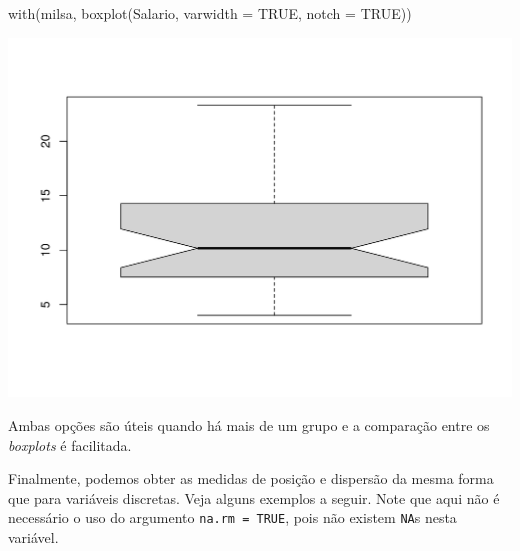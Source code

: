 \documentclass[
  10pt,
  a4paper]{book}
\newenvironment{Shaded}{\begin{snugshade}}{\end{snugshade}}
\newcommand{\AttributeTok}[1]{\textcolor[rgb]{0.77,0.63,0.00}{#1}}
\newcommand{\ConstantTok}[1]{\textcolor[rgb]{0.00,0.00,0.00}{#1}}
\newcommand{\FunctionTok}[1]{\textcolor[rgb]{0.00,0.00,0.00}{#1}}
\newcommand{\NormalTok}[1]{#1}
\begin{document}
\begin{Shaded}
\begin{Highlighting}[]
\FunctionTok{with}\NormalTok{(milsa, }\FunctionTok{boxplot}\NormalTok{(Salario, }\AttributeTok{varwidth =} \ConstantTok{TRUE}\NormalTok{, }\AttributeTok{notch =} \ConstantTok{TRUE}\NormalTok{))}
\end{Highlighting}
\end{Shaded}

\begin{center}\includegraphics{figures/unnamed-chunk-315-1} \end{center}

Ambas opções são úteis quando há mais de um grupo e a comparação entre
os \emph{boxplots} é facilitada.

Finalmente, podemos obter as medidas de posição e dispersão da mesma
forma que para variáveis discretas. Veja alguns exemplos a seguir. Note
que aqui não é necessário o uso do argumento \texttt{na.rm\ =\ TRUE}, pois não
existem \texttt{NA}s nesta variável.
\end{document}
